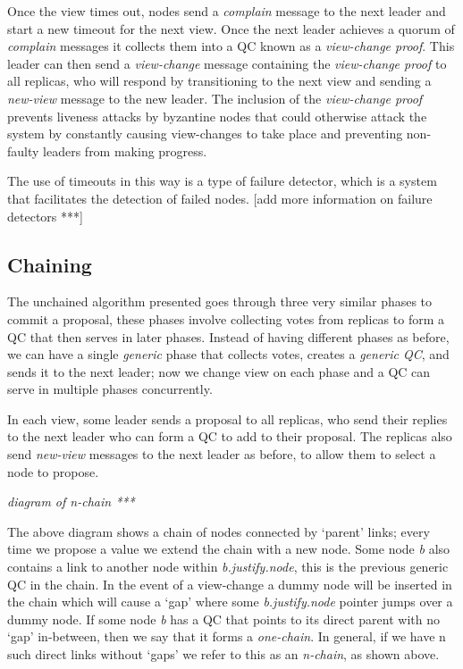 Once the view times out, nodes send a \textit{complain} message to the next leader and start a new timeout for the next view. Once the next leader achieves a quorum of \textit{complain} messages it collects them into a QC known as a \textit{view-change proof}. This leader can then send a \textit{view-change} message containing the \textit{view-change proof} to all replicas, who will respond by transitioning to the next view and sending a \textit{new-view} message to the new leader. The inclusion of the \textit{view-change proof} prevents liveness attacks by byzantine nodes that could otherwise attack the system by constantly causing view-changes to take place and preventing non-faulty leaders from making progress.

The use of timeouts in this way is a type of failure detector, which is a system that facilitates the detection of failed nodes. [add more information on failure detectors ***]
\subsection{Chaining} \label{chaining}
The unchained algorithm presented goes through three very similar phases to commit a proposal, these phases involve collecting votes from replicas to form a QC that then serves in later phases. Instead of having different phases as before, we can have a single \textit{generic} phase that collects votes, creates a \textit{generic QC}, and sends it to the next leader; now we change view on each phase and a QC can serve in multiple phases concurrently.

In each view, some leader sends a proposal to all replicas, who send their replies to the next leader who can form a QC to add to their proposal. The replicas also send \textit{new-view} messages to the next leader as before, to allow them to select a node to propose.

\textit{diagram of n-chain ***}

The above diagram shows a chain of nodes connected by `parent' links; every time we propose a value we extend the chain with a new node. Some node \textit{b} also contains a link to another node within \textit{b.justify.node}, this is the previous generic QC in the chain. In the event of a view-change a dummy node will be inserted in the chain which will cause a `gap' where some \textit{b.justify.node} pointer jumps over a dummy node. If some node \textit{b} has a QC that points to its direct parent with no `gap' in-between, then we say that it forms a \textit{one-chain}. In general, if we have n such direct links without `gaps' we refer to this as an \textit{n-chain}, as shown above.

